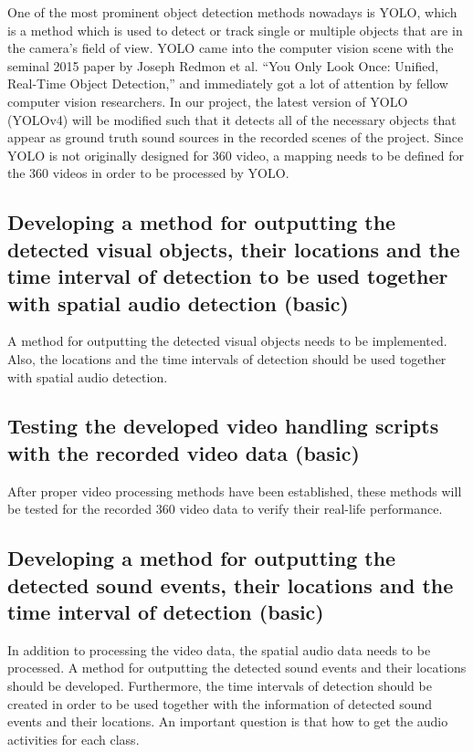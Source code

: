 One of the most prominent object detection methods nowadays is YOLO, which is a method which is used to detect or
track single or multiple objects that are in the camera's field of view. YOLO came into the computer vision scene
with the seminal 2015 paper by Joseph Redmon et al. “You Only Look Once: Unified, Real-Time Object Detection,”
and immediately got a lot of attention by fellow computer vision researchers. In our project, the latest version
of YOLO (YOLOv4) will be modified such that it detects all of the necessary objects that appear as ground truth
sound sources in the recorded scenes of the project. Since YOLO is not originally designed for 360 video, a
mapping needs to be defined for the 360 videos in order to be processed by YOLO.

\subsection{Developing a method for outputting the detected visual objects, their locations and the time interval of detection to be used together with spatial audio detection (basic)}

A method for outputting the detected visual objects needs to be implemented. Also, the locations and the time
intervals of detection should be used together with spatial audio detection.

\subsection{Testing the developed video handling scripts with the recorded video data (basic)}

After proper video processing methods have been established, these methods will be tested for the recorded 360
video data to verify their real-life performance.

\subsection{Developing a method for outputting the detected sound events, their locations and the time interval of detection (basic)}

In addition to processing the video data, the spatial audio data needs to be processed. A method for outputting
the detected sound events and their locations should be developed. Furthermore, the time intervals of detection
should be created in order to be used together with the information of detected sound events and their locations.
An important question is that how to get the audio activities for each class.

